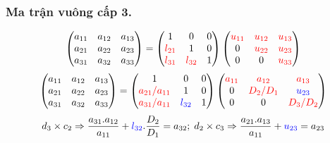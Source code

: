 \documentclass[12pt, a4paper]{report}
\begin{document}
\subsubsection{Ma trận vuông cấp 3.}
\[
    \begin{pmatrix}
        a_{11} & a_{12} & a_{13} \\
        a_{21} & a_{22} & a_{23} \\
        a_{31} & a_{32} & a_{33} \\
    \end{pmatrix}  = \begin{pmatrix}
        1 & 0 & 0 \\
        \textcolor{red}{l_{21}} & 1 & 0 \\
        \textcolor{red}{l_{31}} & \textcolor{red}{l_{32}} & 1 \\
    \end{pmatrix} \begin{pmatrix}
        \textcolor{red}{u_{11}} & \textcolor{red}{u_{12}} & \textcolor{red}{u_{13}} \\
        0 & \textcolor{red}{u_{22}} & \textcolor{red}{u_{23}} \\
        0 & 0 & \textcolor{red}{u_{33}} \\
    \end{pmatrix}
\]
\[
    \begin{pmatrix}
        a_{11} & a_{12} & a_{13} \\
        a_{21} & a_{22} & a_{23} \\
        a_{31} & a_{32} & a_{33} \\
    \end{pmatrix}  = \begin{pmatrix}
        1 & 0 & 0 \\
        \textcolor{red}{a_{21}/a_{11}} & 1 & 0 \\
        \textcolor{red}{a_{31}/a_{11}} & \textcolor{blue}{l_{32}}  & 1 \\
    \end{pmatrix} \begin{pmatrix}
        \textcolor{red}{a_{11}} & \textcolor{red}{a_{12}} & \textcolor{red}{a_{13}} \\
        0 & \textcolor{red}{D_2/D_1} & \textcolor{blue}{u_{23}} \\
        0 & 0 & \textcolor{red}{D_3/D_2} \\
    \end{pmatrix}
\]
\[
    d_3 \times c_2 \Rightarrow \frac{a_{31}.a_{12}}{a_{11}} +  \textcolor{blue}{l_{32}}.\dfrac{D_2}{D_1} = a_{32}; \thickspace d_2 \times c_3 \Rightarrow \frac{a_{21}.a_{13}}{a_{11}}+ \textcolor{blue}{u_{23}}=a_{23}
\]
\end{document}
